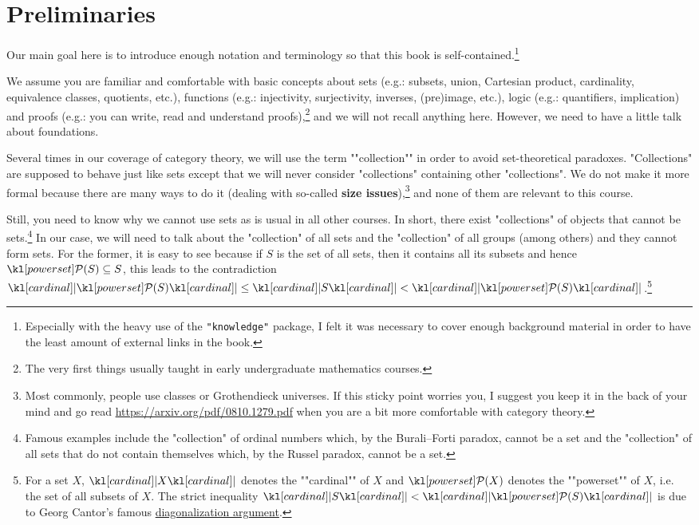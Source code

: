 \documentclass[main.tex]{subfiles}
\begin{document}
\chapter{Preliminaries}\label{chap:prelim}
Our main goal here is to introduce enough notation and terminology so that this book is self-contained.\footnote{Especially with the heavy use of the \texttt{"knowledge"} package, I felt it was necessary to cover enough background material in order to have the least amount of external links in the book.}

We assume you are familiar and comfortable with basic concepts about sets (e.g.: subsets, union, Cartesian product, cardinality, equivalence classes, quotients, etc.), functions (e.g.: injectivity, surjectivity, inverses, (pre)image, etc.), logic (e.g.: quantifiers, implication) and proofs (e.g.: you can write, read and understand proofs),\footnote{The very first things usually taught in early undergraduate mathematics courses.} and we will not recall anything here. However, we need to have a little talk about foundations.

\AP Several times in our coverage of category theory, we will use the term ""collection"" in order to avoid set-theoretical paradoxes. "Collections" are supposed to behave just like sets except that we will never consider "collections" containing other "collections". We do not make it more formal because there are many ways to do it (dealing with so-called \textbf{size issues}),\footnote{Most commonly, people use classes or Grothendieck universes. If this sticky point worries you, I suggest you keep it in the back of your mind and go read \url{https://arxiv.org/pdf/0810.1279.pdf} when you are a bit more comfortable with category theory.} and none of them are relevant to this course.

Still, you need to know why we cannot use sets as is usual in all other courses. In short, there exist "collections" of objects that cannot be sets.\footnote{Famous examples include the "collection" of ordinal numbers which, by the Burali--Forti paradox, cannot be a set and the "collection" of all sets that do not contain themselves which, by the Russel paradox, cannot be a set.} In our case, we will need to talk about the "collection" of all sets and the "collection" of all groups (among others) and they cannot form sets. For the former, it is easy to see because if $S$ is the set of all sets, then it contains all its subsets and hence $\mP(S) \subseteq S$, this leads to the contradiction $\cardinal{\mP(S)} \leq \cardinal{S} < \cardinal{\mP(S)}$.\footnote{\AP For a set $X$, $\cardinal{X}$ denotes the ""cardinal"" of $X$ and $\mP(X)$ denotes the ""powerset"" of $X$, i.e. the set of all subsets of $X$. The strict inequality $\cardinal{S} < \cardinal{\mP(S)}$ is due to Georg Cantor's famous \href{https://en.wikipedia.org/wiki/Cantor's_diagonal_argument}{diagonalization argument}.}
\end{document}
